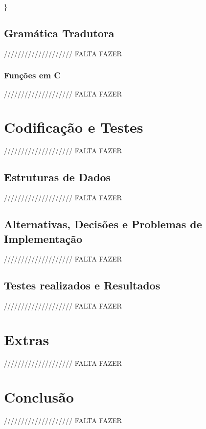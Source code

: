 \documentclass[11pt,a4paper]{report}
\begin{document}
\hspace{0.7cm} \}


\section{Gramática Tradutora}

//////////////////// FALTA FAZER

\subsection{Funções em C}

//////////////////// FALTA FAZER

\chapter{Codificação e Testes}
\label{chap:codificacao}

//////////////////// FALTA FAZER

\section{Estruturas de Dados}

//////////////////// FALTA FAZER

\section{Alternativas, Decisões e Problemas de Implementação}

//////////////////// FALTA FAZER

\section{Testes realizados e Resultados}

//////////////////// FALTA FAZER

\chapter{Extras}
\label{chap:extras}

//////////////////// FALTA FAZER

\chapter{Conclusão}
\label{chap:concl}

//////////////////// FALTA FAZER
\end{document}
